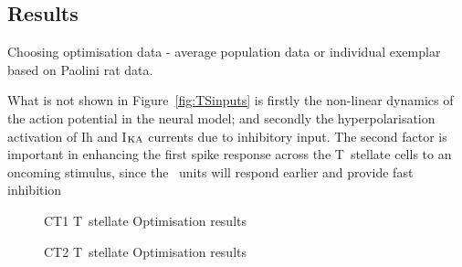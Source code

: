 \subsection{Results}

Choosing optimisation data - average population data or individual exemplar based on Paolini rat data.


What is not shown in Figure~\ref{fig:TSinputs} is firstly the non-linear
dynamics of the action potential in the neural model; and secondly the
hyperpolarisation activation of Ih and I$_{\rm KA}$ currents due to inhibitory
input.  The second factor is important in enhancing the first spike response
across the T~stellate cells \citep{PaoliniClareyEtAl:2004}to an oncoming
stimulus, since the \OnC~units will respond earlier and provide fast inhibition 


\begin{figure}[htb]
  \centering
  \caption[CT1 T~stellate Optimisation results]{CT1 T~stellate Optimisation results}
  \label{fig:CT1results}
\end{figure}

\begin{figure}[htb]
  \centering
  \caption[CT2 T~stellate Optimisation results]{CT2 T~stellate Optimisation results}
  \label{fig:CT2results}
\end{figure}



